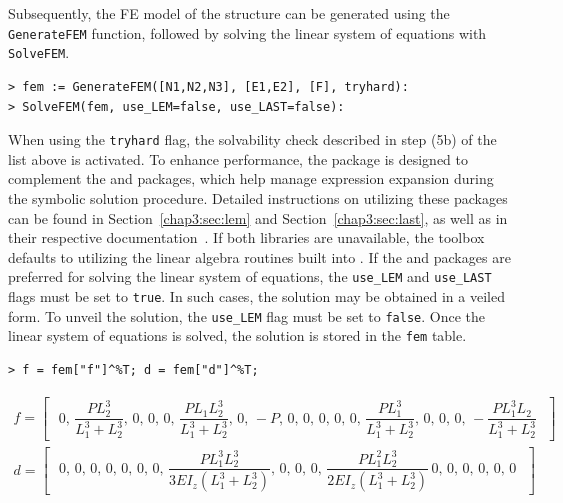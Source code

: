Subsequently, the \ac{FE} model of the structure can be generated using the \texttt{GenerateFEM} function, followed by solving the linear system of equations with \texttt{SolveFEM}.
%
\begin{verbatim}
> fem := GenerateFEM([N1,N2,N3], [E1,E2], [F], tryhard):
> SolveFEM(fem, use_LEM=false, use_LAST=false):
\end{verbatim}
%
When using the \texttt{tryhard} flag, the solvability check described in step (5b) of the list above is activated. To enhance performance, the \TrussMe{} package is designed to complement the \LEM{} and \LAST{} packages, which help manage expression expansion during the symbolic solution procedure. Detailed instructions on utilizing these packages can be found in Section~\ref{chap3:sec:lem} and Section~\ref{chap3:sec:last}, as well as in their respective documentation~\cite{lem, last}. If both libraries are unavailable, the toolbox defaults to utilizing the linear algebra routines built into \Maple{}. If the \LEM{} and \LAST{} packages are preferred for solving the linear system of equations, the \texttt{use\_LEM} and \texttt{use\_LAST} flags must be set to \texttt{true}. In such cases, the solution may be obtained in a veiled form. To unveil the solution, the \texttt{use\_LEM} flag must be set to \texttt{false}. Once the linear system of equations is solved, the solution is stored in the \texttt{fem} table.
%
\begin{verbatim}
> f = fem["f"]^%T; d = fem["d"]^%T;
\end{verbatim}
\begin{equation*}
  \begin{matrix}
    f = \left[\,\begin{matrix}
      \, 0, \, \dfrac{PL_2^3}{L_1^3+L_2^3}, \, 0, \, 0, \, 0, \, \dfrac{PL_1L_2^3}{L_1^3+L_2^3}, \, 0, \, -P, \, 0, \, 0, \, 0, \, 0, \, 0, \, \dfrac{PL_1^3}{L_1^3+L_2^3}, \, 0, \, 0, \, 0, \, -\dfrac{PL_1^3L_2}{L_1^3+L_2^3} \,
    \end{matrix}\,\right] \\[1.5em]
    d = \left[\,\begin{matrix}
      \, 0, \, 0, \, 0, \, 0, \, 0, \, 0, \, 0, \, \dfrac{PL_1^3L_2^3}{3EI_z(L_1^3+L_2^3)}, \, 0, \, 0, \, 0, \, \dfrac{PL_1^2L_2^3}{2EI_z(L_1^3+L_2^3)} \, 0, \, 0, \, 0, \, 0, \, 0, \, 0 \,
    \end{matrix}\,\right]
  \end{matrix}
\end{equation*}

